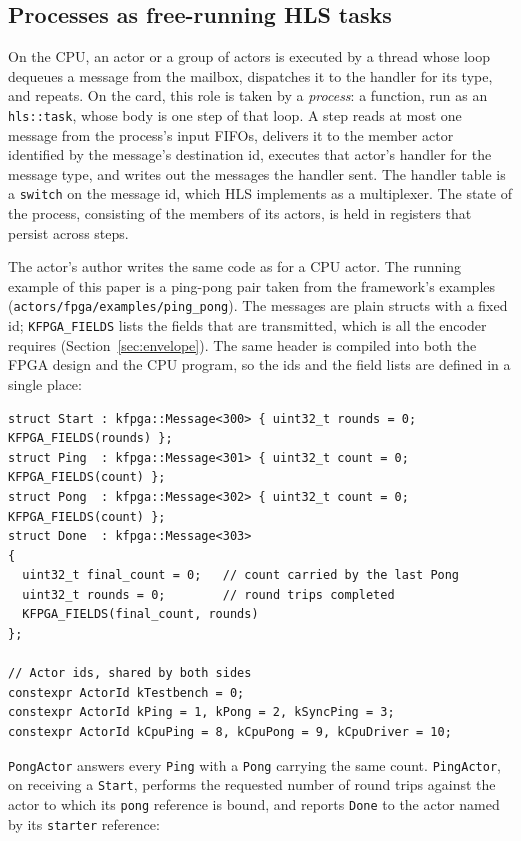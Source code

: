 \documentclass[11pt]{article}
\begin{document}
\subsection{Processes as free-running HLS tasks}
\label{sec:process}

On the CPU, an actor or a group of actors is executed by a thread whose loop
dequeues a message from the mailbox, dispatches it to the handler for its type,
and repeats. On the card, this role is taken by a \emph{process}: a function,
run as an \texttt{hls::task}, whose body is one step of that loop. A step reads
at most one message from the process's input FIFOs, delivers it to the member
actor identified by the message's destination id, executes that actor's handler
for the message type, and writes out the messages the handler sent. The handler
table is a \texttt{switch} on the message id, which HLS implements as a
multiplexer. The state of the process, consisting of the members of its actors,
is held in registers that persist across steps.

The actor's author writes the same code as for a CPU actor. The running example
of this paper is a ping-pong pair taken from the framework's examples
(\texttt{actors/fpga/examples/ping\_pong}). The messages are plain structs with
a fixed id; \texttt{KFPGA\_FIELDS} lists the fields that are transmitted, which
is all the encoder requires (Section~\ref{sec:envelope}). The same header is
compiled into both the FPGA design and the CPU program, so the ids and the
field lists are defined in a single place:

\begin{lstlisting}
struct Start : kfpga::Message<300> { uint32_t rounds = 0; KFPGA_FIELDS(rounds) };
struct Ping  : kfpga::Message<301> { uint32_t count = 0;  KFPGA_FIELDS(count) };
struct Pong  : kfpga::Message<302> { uint32_t count = 0;  KFPGA_FIELDS(count) };
struct Done  : kfpga::Message<303>
{
  uint32_t final_count = 0;   // count carried by the last Pong
  uint32_t rounds = 0;        // round trips completed
  KFPGA_FIELDS(final_count, rounds)
};

// Actor ids, shared by both sides
constexpr ActorId kTestbench = 0;
constexpr ActorId kPing = 1, kPong = 2, kSyncPing = 3;
constexpr ActorId kCpuPing = 8, kCpuPong = 9, kCpuDriver = 10;
\end{lstlisting}

\noindent \texttt{PongActor} answers every \texttt{Ping} with a \texttt{Pong}
carrying the same count. \texttt{PingActor}, on receiving a \texttt{Start},
performs the requested number of round trips against the actor to which its
\texttt{pong} reference is bound, and reports \texttt{Done} to the actor named
by its \texttt{starter} reference:
\end{document}
